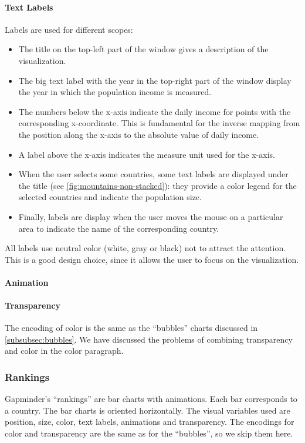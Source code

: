 \paragraph{Text Labels}
Labels are used for different scopes:
\begin{itemize}
	\item The title on the top-left part of the window gives a description of the visualization.
	\item The big text label with the year in the top-right part of the window display the year in which the population income is measured.
	\item The numbers below the x-axis indicate the daily income for points with the corresponding x-coordinate. This is fundamental for the inverse mapping from the position along the x-axis to the absolute value of daily income.
	\item A label above the x-axis indicates the measure unit used for the x-axis.
	\item When the user selects some countries, some text labels are displayed under the title (see \cref{fig:mountains-non-stacked}): they provide a color legend for the selected countries and indicate the population size.
	\item Finally, labels are display when the user moves the mouse on a particular area to indicate the name of the corresponding country.
\end{itemize}
All labels use neutral color (white, gray or black) not to attract the attention.
This is a good design choice, since it allows the user to focus on the visualization.

\paragraph{Animation}

\paragraph{Transparency}
The encoding of color is the same as the ``bubbles'' charts discussed in \cref{subsubsec:bubbles}.
We have discussed the problems of combining transparency and color in the color paragraph.


\subsubsection{Rankings}
Gapminder's ``rankings'' are bar charts with animations.
Each bar corresponds to a country.
The bar charts is oriented horizontally.
The visual variables used are position, size, color, text labels, animations and transparency.
The encodings for color and transparency are the same as for the ``bubbles'', so we skip them here.

